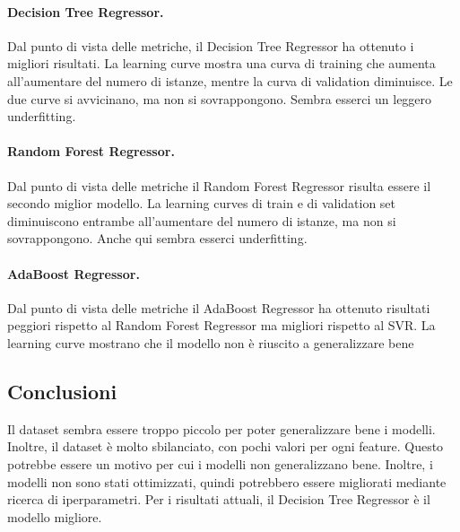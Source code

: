    
    \paragraph{\textbf{Decision Tree Regressor}.}
    Dal punto di vista delle metriche, il Decision Tree Regressor ha ottenuto i migliori risultati. 
    La learning curve mostra una curva di training che aumenta all'aumentare del numero di istanze, mentre la curva di validation diminuisce. Le due curve si avvicinano, ma non si sovrappongono. Sembra esserci un leggero underfitting.
    \paragraph{\textbf{Random Forest Regressor}.}
    Dal punto di vista delle metriche il Random Forest Regressor risulta essere il secondo miglior modello.
    La learning curves di train e di validation set diminuiscono entrambe all'aumentare del numero di istanze, ma non si sovrappongono. Anche qui sembra esserci underfitting.
    \paragraph{\textbf{AdaBoost Regressor}.}
    Dal punto di vista delle metriche il AdaBoost Regressor ha ottenuto risultati peggiori rispetto al Random Forest Regressor ma migliori rispetto al SVR.
    La learning curve mostrano che il modello non è riuscito a generalizzare bene


\subsection{Conclusioni}
Il dataset sembra essere troppo piccolo per poter generalizzare bene i modelli. Inoltre, il dataset è molto sbilanciato, con pochi valori per ogni feature. Questo potrebbe essere un motivo per cui i modelli non generalizzano bene. Inoltre, i modelli non sono stati ottimizzati, quindi potrebbero essere migliorati mediante ricerca di iperparametri.
Per i risultati attuali, il Decision Tree Regressor è il modello migliore.